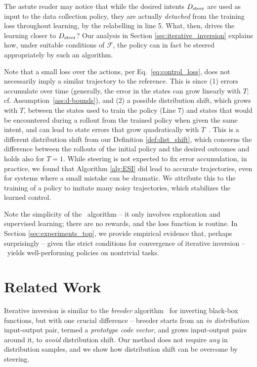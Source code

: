 \documentclass[nohyperref]{article}
\begin{document}
The astute reader may notice that while the desired intents $D_{\mathrm{steer}}$ are used as input to the data collection policy, they are actually \textit{detached} from the training loss throughout learning, by the relabelling in line 5. %
What, then, drives the learning closer to $D_{\mathrm{steer}}$? Our analysis in Section \ref{sec:iterative_inversion} explains how, under suitable conditions of $\mathcal{F}$, the policy can in fact be steered appropriately by such an algorithm.



\begin{remark}
Note that a small loss over the actions, per Eq.~\eqref{eq:control_loss}, does not necessarily imply a similar trajectory to the reference. This is since (1) errors accumulate over time (generally, the error in the states can grow linearly with $T$; cf. Assumption~\ref{ass:d-bounds}), and (2) a possible distribution shift, which grows with $T$, between the states used to train the policy (Line 7) %
and states that would be encountered during a rollout from the trained policy when given the same intent, and can lead to state errors that grow quadratically with $T$~\cite{ross2011reduction}. This is a different distribution shift from our Definition \ref{def:dist_shift}, which concerns the difference between the rollouts of the initial policy and the desired outcomes and holds also for $T=1$. While steering is not expected to fix error accumulation, in practice, we found that Algorithm \ref{alg:ESI} did lead to accurate trajectories, even for systems where a small mistake can be dramatic. We attribute this to the training of a policy to imitate many noisy trajectories, which stabilizes the learned control.
\end{remark}


Note the simplicity of the \methodname\ algorithm -- it only involves exploration and supervised learning; there are no rewards, and the loss function is routine. In Section \ref{sec:experiments_top}, we provide empirical evidence that, perhaps surprisingly -- given the strict conditions for convergence of iterative inversion -- \methodname\ yields well-performing policies on nontrivial tasks. 

\section{Related Work}

Iterative inversion is similar to the \textit{breeder} algorithm~\citep{nair2008analysis} for inverting black-box functions, but with one crucial difference -- breeder starts from an \textit{in distribution} input-output pair, termed a \textit{prototype code vector}, and grows input-output pairs around it, to \textit{avoid} distribution shift. Our method does not require \textit{any} in distribution samples, and  we show how distribution shift can be overcome by steering. 
\end{document}
